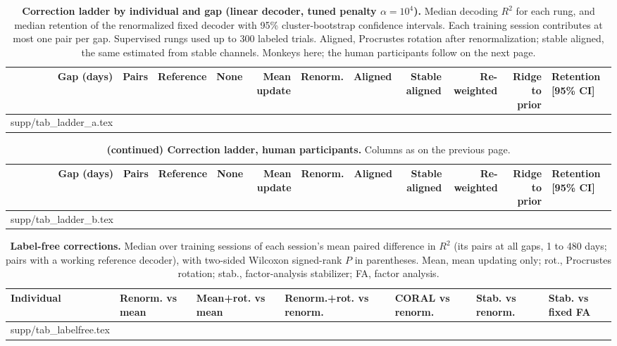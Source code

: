 \documentclass[pdflatex,sn-nature]{sn-jnl}
\makeatletter
\newcommand\tabinput[1]{\@@input #1 }
\makeatother
\begin{document}
\begin{landscape}
\begin{table}[p]
\caption{\textbf{Correction ladder by individual and gap (linear decoder, tuned penalty $\alpha = 10^4$).} Median decoding $R^2$ for
each rung, and median retention of the renormalized fixed decoder with 95\% cluster-bootstrap confidence intervals.
Each training session contributes at most one pair per gap. Supervised rungs used up to 300 labeled trials.
Aligned, Procrustes rotation after renormalization; stable aligned, the same estimated from stable channels. Monkeys
here; the human participants follow on the next page.}
\label{tab:ladder}
\scriptsize\setlength{\tabcolsep}{2.8pt}
\begin{tabular}{@{}rrrrrrrrrrl@{}}
\toprule
Gap (days) & Pairs & Reference & None & Mean update & Renorm. & Aligned & Stable aligned & Re-weighted & Ridge to prior &
Retention [95\% CI] \\
\midrule
\tabinput{supp/tab_ladder_a.tex}
\botrule
\end{tabular}
\end{table}
\end{landscape}

\begin{landscape}
\begin{table}[p]
\addtocounter{table}{-1}
\caption{\textbf{(continued) Correction ladder, human participants.} Columns as on the previous page.}
\fontsize{6.6}{7.6}\selectfont\setlength{\tabcolsep}{2.8pt}
\begin{tabular}{@{}rrrrrrrrrrl@{}}
\toprule
Gap (days) & Pairs & Reference & None & Mean update & Renorm. & Aligned & Stable aligned & Re-weighted & Ridge to prior &
Retention [95\% CI] \\
\midrule
\tabinput{supp/tab_ladder_b.tex}
\botrule
\end{tabular}
\end{table}
\end{landscape}

\begin{landscape}
\begin{table}[p]
\caption{\textbf{Label-free corrections.} Median over training sessions of each session's mean paired difference in
$R^2$ (its pairs at all gaps, 1 to 480 days; pairs with a working reference decoder), with two-sided Wilcoxon
signed-rank $P$ in parentheses. Mean, mean updating only; rot., Procrustes rotation; stab., factor-analysis stabilizer; FA, factor
analysis.}
\label{tab:labelfree}
\scriptsize\setlength{\tabcolsep}{3.5pt}
\begin{tabular}{@{}lllllll@{}}
\toprule
Individual & Renorm. vs mean & Mean+rot. vs mean & Renorm.+rot. vs renorm. & CORAL vs renorm. & Stab. vs renorm. &
Stab. vs fixed FA \\
\midrule
\tabinput{supp/tab_labelfree.tex}
\botrule
\end{tabular}
\end{table}
\end{landscape}
\end{document}
